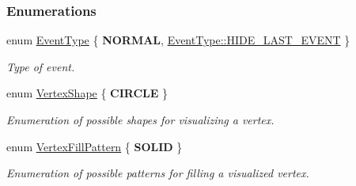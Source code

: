\subsubsection*{Enumerations}
\begin{DoxyCompactItemize}
\item 
enum \hyperlink{namespaceslb_1_1core_1_1ui_ae44f7078122b3f63928fd619fadd2dcd}{Event\+Type} \{ {\bfseries N\+O\+R\+M\+AL}, 
\hyperlink{namespaceslb_1_1core_1_1ui_ae44f7078122b3f63928fd619fadd2dcdac026b5123133ac2e7603b51574146256}{Event\+Type\+::\+H\+I\+D\+E\+\_\+\+L\+A\+S\+T\+\_\+\+E\+V\+E\+NT}
 \}\begin{DoxyCompactList}\small\item\em Type of event. \end{DoxyCompactList}
\item 
enum \hyperlink{namespaceslb_1_1core_1_1ui_a5bba432158f178915f460bdcf8a047a7}{Vertex\+Shape} \{ {\bfseries C\+I\+R\+C\+LE}
 \}\hypertarget{namespaceslb_1_1core_1_1ui_a5bba432158f178915f460bdcf8a047a7}{}\label{namespaceslb_1_1core_1_1ui_a5bba432158f178915f460bdcf8a047a7}
\begin{DoxyCompactList}\small\item\em Enumeration of possible shapes for visualizing a vertex. \end{DoxyCompactList}
\item 
enum \hyperlink{namespaceslb_1_1core_1_1ui_a0d123eba2567be5964595af181c9c3d1}{Vertex\+Fill\+Pattern} \{ {\bfseries S\+O\+L\+ID}
 \}\hypertarget{namespaceslb_1_1core_1_1ui_a0d123eba2567be5964595af181c9c3d1}{}\label{namespaceslb_1_1core_1_1ui_a0d123eba2567be5964595af181c9c3d1}
\begin{DoxyCompactList}\small\item\em Enumeration of possible patterns for filling a visualized vertex. \end{DoxyCompactList}
\end{DoxyCompactItemize}

